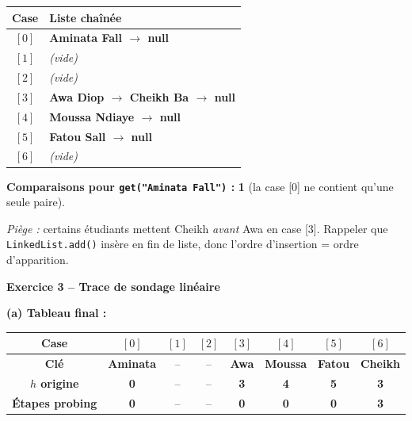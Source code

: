 \documentclass[10pt,a4paper]{article}
\newcommand{\cor}[1]{{\color{corrcolor}\textbf{#1}}}
\newcommand{\corm}[1]{{\color{corrcolor}#1}}
\begin{document}
\begin{center}
\small
\renewcommand{\arraystretch}{1.5}
\begin{tabular}{|c|p{11cm}|}
\hline
\textbf{Case} & \textbf{Liste chaînée} \\
\hline
$[0]$ & \cor{Aminata Fall $\to$ null} \\
\hline
$[1]$ & \corm{\textit{(vide)}} \\
\hline
$[2]$ & \corm{\textit{(vide)}} \\
\hline
$[3]$ & \cor{Awa Diop $\to$ Cheikh Ba $\to$ null} \\
\hline
$[4]$ & \cor{Moussa Ndiaye $\to$ null} \\
\hline
$[5]$ & \cor{Fatou Sall $\to$ null} \\
\hline
$[6]$ & \corm{\textit{(vide)}} \\
\hline
\end{tabular}
\end{center}

\medskip

\textbf{Comparaisons pour \texttt{get("Aminata Fall")} :} \cor{1} (la case [0] ne contient qu'une seule paire).

\medskip

\corm{\textit{Piège :} certains étudiants mettent Cheikh \emph{avant} Awa en case [3]. Rappeler que \texttt{LinkedList.add()} insère en fin de liste, donc l'ordre d'insertion = ordre d'apparition.}

\vspace{0.4cm}

\textbf{\large Exercice 3 -- Trace de sondage linéaire}

\vspace{0.15cm}

\textbf{(a) Tableau final :}

\begin{center}
\small
\renewcommand{\arraystretch}{1.5}
\begin{tabular}{|c|c|c|c|c|c|c|c|}
\hline
\textbf{Case} & $[0]$ & $[1]$ & $[2]$ & $[3]$ & $[4]$ & $[5]$ & $[6]$ \\
\hline
\textbf{Clé} & \cor{Aminata} & \corm{--} & \corm{--} & \cor{Awa} & \cor{Moussa} & \cor{Fatou} & \cor{Cheikh} \\
\hline
\textbf{$h$ origine} & \cor{0} & \corm{--} & \corm{--} & \cor{3} & \cor{4} & \cor{5} & \cor{3} \\
\hline
\textbf{Étapes probing} & \cor{0} & \corm{--} & \corm{--} & \cor{0} & \cor{0} & \cor{0} & \cor{3} \\
\hline
\end{tabular}
\end{center}
\end{document}
